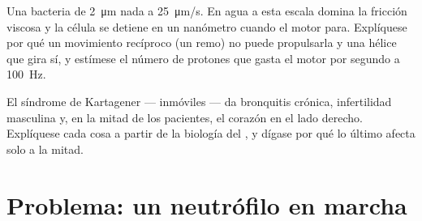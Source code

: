 \begin{exercise}[$\star\star\star$]\label{exo:b3:cytoskeleton-motility:11}
Una bacteria de \qty{2}{\micro m} nada a \qty{25}{\micro m/s}. En agua a
esta escala domina la fricción viscosa y la célula se detiene en un
nanómetro cuando el motor para. Explíquese por qué un movimiento
recíproco (un remo) no puede propulsarla y una hélice que gira sí, y
estímese el número de protones que gasta el motor por segundo a
\qty{100}{Hz}.
\end{exercise}

\begin{exercise}[$\star\star\star$]\label{exo:b3:cytoskeleton-motility:12}
El síndrome de Kartagener ---  inmóviles --- da bronquitis
crónica, infertilidad masculina y, en la mitad de los pacientes, el
corazón en el lado derecho. Explíquese cada cosa a partir de la biología
del , y dígase por qué lo último afecta solo a la mitad.
\end{exercise}

\section{Problema: un neutrófilo en marcha}

